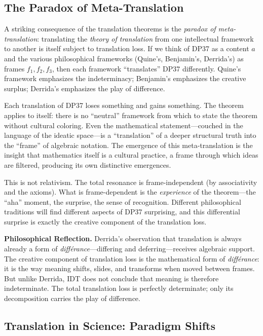\subsection{The Paradox of Meta-Translation}

A striking consequence of the translation theorems is the \emph{paradox of
meta-translation}: translating the \emph{theory of translation} from one
intellectual framework to another is itself subject to translation loss.  If
we think of DP37 as a content $a$ and the various philosophical frameworks
(Quine's, Benjamin's, Derrida's) as frames $f_1, f_2, f_3$, then each
framework ``translates'' DP37 differently.  Quine's framework emphasizes the
indeterminacy; Benjamin's emphasizes the creative surplus; Derrida's
emphasizes the play of difference.

Each translation of DP37 loses something and gains something.  The theorem
applies to itself: there is no ``neutral'' framework from which to state the
theorem without cultural coloring.  Even the mathematical statement---couched
in the language of the ideatic space---is a ``translation'' of a deeper
structural truth into the ``frame'' of algebraic notation.  The emergence of
this meta-translation is the insight that mathematics itself is a cultural
practice, a frame through which ideas are filtered, producing its own
distinctive emergences.

This is not relativism.  The total resonance is frame-independent (by
associativity and the axioms).  What is frame-dependent is the
\emph{experience} of the theorem---the ``aha'' moment, the surprise, the
sense of recognition.  Different philosophical traditions will find different
aspects of DP37 surprising, and this differential surprise is exactly the
creative component of the translation loss.

\begin{reflectionbox}
\noindent\textbf{Philosophical Reflection.}
Derrida's observation that translation is always already a form of
\textit{diff\'erance}---differing and deferring---receives algebraic
support.  The creative component of translation loss is the mathematical
form of \textit{diff\'erance}: it is the way meaning shifts, slides, and
transforms when moved between frames.  But unlike Derrida, IDT does not
conclude that meaning is therefore indeterminate.  The total translation loss
is perfectly determinate; only its decomposition carries the play of
difference.
\end{reflectionbox}

\subsection{Translation in Science: Paradigm Shifts}

